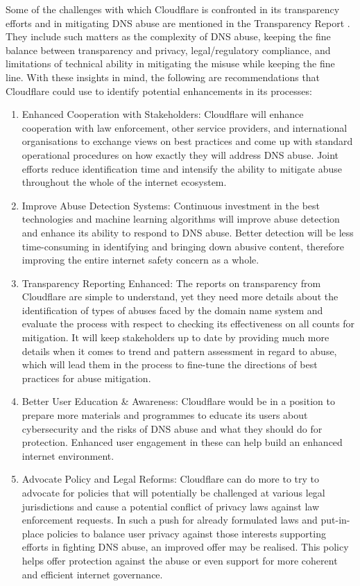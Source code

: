 \begin{enumerate}
\begin{enumerate}
\end{enumerate}

Some of the challenges with which Cloudflare is confronted in its transparency efforts and in mitigating DNS abuse are mentioned in the Transparency Report . They include such matters as the complexity of DNS abuse, keeping the fine balance between transparency and privacy, legal/regulatory compliance, and limitations of technical ability in mitigating the misuse while keeping the fine line. With these insights in mind, the following are recommendations that Cloudflare could use to identify potential enhancements in its processes:

\begin{enumerate}
    \item Enhanced Cooperation with Stakeholders: Cloudflare will enhance cooperation with law enforcement, other service providers, and international organisations to exchange views on best practices and come up with standard operational procedures on how exactly they will address DNS abuse. Joint efforts reduce identification time and intensify the ability to mitigate abuse throughout the whole of the internet ecosystem.
    \item Improve Abuse Detection Systems: Continuous investment in the best technologies and machine learning algorithms will improve abuse detection and enhance its ability to respond to DNS abuse. Better detection will be less time-consuming in identifying and bringing down abusive content, therefore improving the entire internet safety concern as a whole.
    \item Transparency Reporting Enhanced: The reports on transparency from Cloudflare are simple to understand, yet they need more details about the identification of types of abuses faced by the domain name system and evaluate the process with respect to checking its effectiveness on all counts for mitigation. It will keep stakeholders up to date by providing much more details when it comes to trend and pattern assessment in regard to abuse, which will lead them in the process to fine-tune the directions of best practices for abuse mitigation.
    \item Better User Education \& Awareness: Cloudflare would be in a position to prepare more materials and programmes to educate its users about cybersecurity and the risks of DNS abuse and what they should do for protection. Enhanced user engagement in these can help build an enhanced internet environment.
    \item Advocate Policy and Legal Reforms: Cloudflare can do more to try to advocate for policies that will potentially be challenged at various legal jurisdictions and cause a potential conflict of privacy laws against law enforcement requests. In such a push for already formulated laws and put-in-place policies to balance user privacy against those interests supporting efforts in fighting DNS abuse, an improved offer may be realised. This policy helps offer protection against the abuse or even support for more coherent and efficient internet governance.

\end{enumerate}
\end{enumerate}
